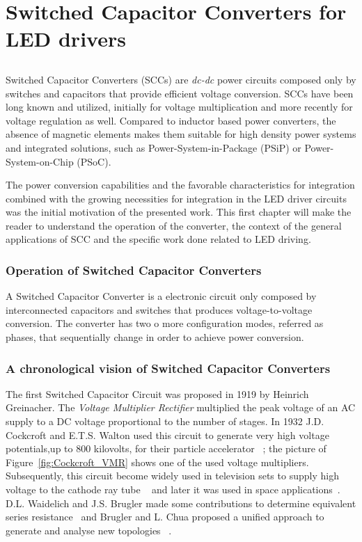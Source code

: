 \part[SCC for LED drivers]{Switched Capacitor Converters for LED drivers}
\label{ch:h_scc}

\chapter{}
Switched Capacitor Converters (SCCs) are \emph{dc-dc} power circuits composed only by switches and capacitors that provide efficient voltage conversion. SCCs have been long known and utilized, initially for voltage multiplication and more recently for voltage regulation as well. Compared to inductor based power converters, the absence of magnetic elements makes them suitable for high density power systems and integrated solutions, such as Power-System-in-Package (PSiP) or Power-System-on-Chip (PSoC).

The power conversion capabilities and the favorable characteristics for integration combined with the growing necessities for integration in the LED driver circuits was the initial motivation of the presented work. This first chapter will make the reader to understand the operation of the converter, the context of the general applications of SCC and the specific work done related to LED driving.

\section{Operation of Switched Capacitor Converters}

A Switched Capacitor Converter is a electronic circuit only composed by interconnected capacitors and switches that produces voltage-to-voltage conversion. The converter has two o more configuration modes, referred as phases, that sequentially change in order to achieve power conversion.

\section[Chronological Vision of SCC]{A chronological vision of Switched Capacitor Converters}

The first Switched Capacitor Circuit was proposed in 1919 by Heinrich Greinacher. The \emph{Voltage Multiplier Rectifier}
multiplied the peak voltage of an AC supply to a DC voltage proportional to the number of stages. In 1932 J.D. Cockcroft and E.T.S. Walton used this circuit to generate very high voltage potentials,up to 800 kilovolts, for their particle accelerator ~\cite{30Cockcroft}; the picture of Figure~\ref{fig:Cockcroft_VMR} shows one of the used voltage multipliers. Subsequently, this circuit become widely used in television sets to supply high voltage to the cathode ray tube ~\cite{1970Buechel} and later it was used in space applications~\cite{1986Weinberg}. D.L. Waidelich and J.S. Brugler made some contributions to determine equivalent series resistance~\cite{44Waidelich,71Brugler} and Brugler and L. Chua proposed a unified approach to generate and analyse new topologies
~\cite{71Brugler,77Lin}.

